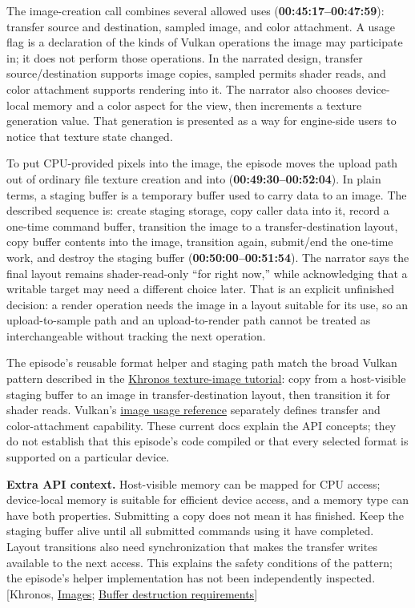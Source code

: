 The image-creation call combines several allowed uses (\textbf{00:45:17--00:47:59}): transfer source and destination, sampled image, and color attachment. A usage flag is a declaration of the kinds of Vulkan operations the image may participate in; it does not perform those operations. In the narrated design, transfer source/destination supports image copies, sampled permits shader reads, and color attachment supports rendering into it. The narrator also chooses device-local memory and a color aspect for the view, then increments a texture generation value. That generation is presented as a way for engine-side users to notice that texture state changed.

To put CPU-provided pixels into the image, the episode moves the upload path out of ordinary file texture creation and into  (\textbf{00:49:30--00:52:04}). In plain terms, a staging buffer is a temporary buffer used to carry data to an image. The described sequence is: create staging storage, copy caller data into it, record a one-time command buffer, transition the image to a transfer-destination layout, copy buffer contents into the image, transition again, submit/end the one-time work, and destroy the staging buffer (\textbf{00:50:00--00:51:54}). The narrator says the final layout remains shader-read-only ``for right now,'' while acknowledging that a writable target may need a different choice later. That is an explicit unfinished decision: a render operation needs the image in a layout suitable for its use, so an upload-to-sample path and an upload-to-render path cannot be treated as interchangeable without tracking the next operation.

The episode's reusable format helper and staging path match the broad Vulkan pattern described in the \href{https://docs.vulkan.org/tutorial/latest/06_Texture_mapping/00_Images.html}{Khronos texture-image tutorial}: copy from a host-visible staging buffer to an image in transfer-destination layout, then transition it for shader reads. Vulkan's \href{https://docs.vulkan.org/refpages/latest/refpages/source/VkImageUsageFlagBits.html}{image usage reference} separately defines transfer and color-attachment capability. These current docs explain the API concepts; they do not establish that this episode's code compiled or that every selected format is supported on a particular device.

\textbf{Extra API context.} Host-visible memory can be mapped for CPU access; device-local memory is suitable for efficient device access, and a memory type can have both properties. Submitting a copy does not mean it has finished. Keep the staging buffer alive until all submitted commands using it have completed. Layout transitions also need synchronization that makes the transfer writes available to the next access. This explains the safety conditions of the pattern; the episode's helper implementation has not been independently inspected. {[}Khronos, \href{https://docs.vulkan.org/tutorial/latest/06_Texture_mapping/00_Images.html}{Images}; \href{https://docs.vulkan.org/refpages/latest/refpages/source/vkDestroyBuffer.html}{Buffer destruction requirements}{]}

